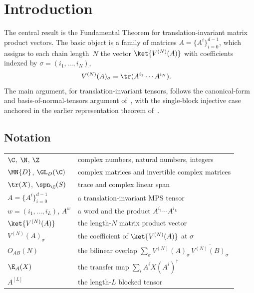 \chapter{Introduction}\label{ch:intro}

The central result is the Fundamental Theorem for translation-invariant
matrix product vectors. The basic object is a family of matrices
$A=\{A^i\}_{i=0}^{d-1}$, which assigns to each chain length~$N$ the vector
$\ket{V^{(N)}(A)}$ with coefficients indexed by
$\sigma=(i_1,\ldots,i_N)$,
\begin{align}
    V^{(N)}(A)_\sigma
     & = \tr(A^{i_1}\cdots A^{i_N}).
    \label{eq:intro_mpv_coefficient}
\end{align}
The main argument, for translation-invariant tensors, follows the canonical-form and
basis-of-normal-tensors argument of~\cite{Cirac2016MPDO_arXiv,Cirac2021Matrix},
with the single-block injective case anchored in the earlier representation
theorem of~\cite{PerezGarcia2007Matrix}.

\section*{Notation}

\begin{center}
    \begin{tabular}{ll}
        $\C$, $\N$, $\Z$            & complex numbers, natural numbers, integers       \\
        $\MN{D}$, $\GL_D(\C)$       & complex matrices and invertible complex matrices \\
        $\tr(X)$, $\spn_{\C}(S)$    & trace and complex linear span                    \\
        $A=\{A^i\}_{i=0}^{d-1}$     & a translation-invariant MPS tensor               \\
        $w=(i_1,\ldots,i_L)$, $A^w$ & a word and the product
        $A^{i_1}\cdots A^{i_L}$                                                        \\
        $\ket{V^{(N)}(A)}$          & the length-$N$ matrix product vector             \\
        $V^{(N)}(A)_\sigma$         & the coefficient of $\ket{V^{(N)}(A)}$ at
        $\sigma$                                                                       \\
        $O_{AB}(N)$                 & the bilinear overlap
        $\sum_\sigma V^{(N)}(A)_\sigma\,\overline{V^{(N)}(B)_\sigma}$                  \\
        $\E_A(X)$                   & the transfer map $\sum_i A^i X(A^i)^\dagger$     \\
        $A^{[L]}$                   & the length-$L$ blocked tensor                    \\
    \end{tabular}
\end{center}

